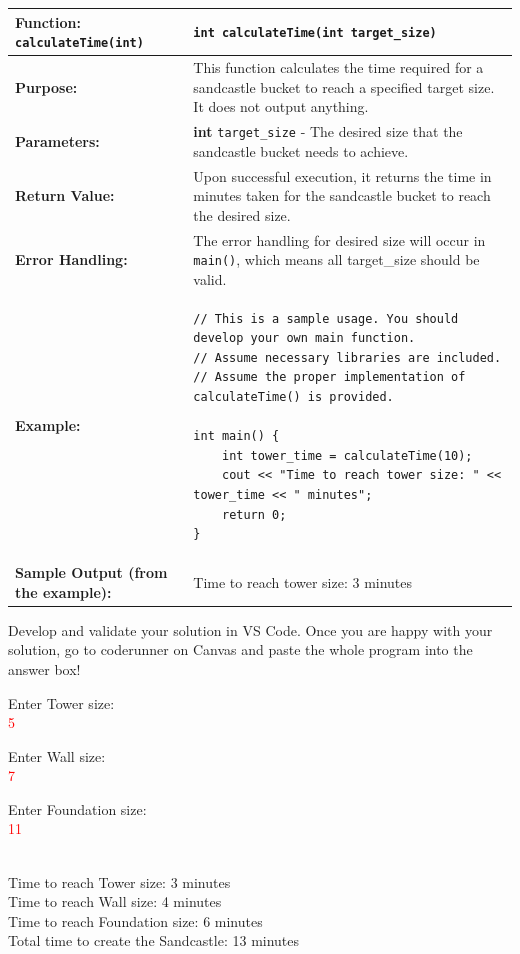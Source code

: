 \begin{longtable}{|p{1.7in}|p{4.3in}|}
\hline
\textbf{Function:}  \texttt{calculateTime(int)} 
& \texttt{int calculateTime(int target_size)} \\ \hline

\textbf{Purpose:} & This function calculates the time required for a sandcastle bucket to reach a specified target size. It does not output anything.  \\ \hline

\textbf{Parameters:} & 
\textbf{int} \texttt{target\_size} - The desired size that the sandcastle bucket needs to achieve. \\ \hline

\textbf{Return Value:} & 
Upon successful execution, it returns the time in minutes taken for the sandcastle bucket to reach the desired size. \\ \hline

\textbf{Error Handling:} & The error handling for desired size will occur in \texttt{main()}, which means all target\_size should be valid. \\ \hline

\textbf{Example:} & 
\begin{verbatim}
// This is a sample usage. You should develop your own main function.
// Assume necessary libraries are included.
// Assume the proper implementation of calculateTime() is provided.

int main() {
    int tower_time = calculateTime(10);
    cout << "Time to reach tower size: " << tower_time << " minutes";
    return 0;
}
\end{verbatim}
\\ \hline

\textbf{Sample Output (from the example):} & Time to reach tower size: 3 minutes\\ \hline

\end{longtable}

Develop and validate your solution in VS Code. Once you are happy with your solution, go to coderunner on Canvas and paste the whole program into the answer box! 

\begin{sample}

Enter Tower size: \\\textcolor{red}{5}

Enter Wall size: \\\textcolor{red}{7}

Enter Foundation size: \\\textcolor{red}{11}

\\Time to reach Tower size: 3 minutes
\\Time to reach Wall size: 4 minutes
\\Time to reach Foundation size: 6 minutes
\\Total time to create the Sandcastle: 13 minutes

\end{sample}

